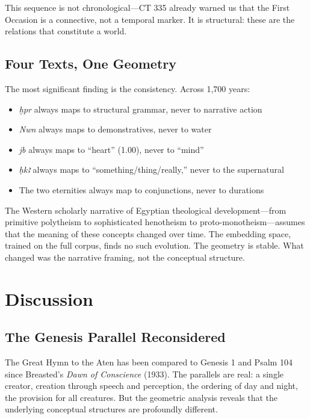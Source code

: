 \documentclass[11pt, a4paper]{article}
\begin{document}
This sequence is not chronological---CT 335 already warned us that the First Occasion is a connective, not a temporal marker. It is structural: these are the relations that constitute a world.

\subsection{Four Texts, One Geometry}

The most significant finding is the consistency. Across 1,700 years:

\begin{itemize}[nosep]
    \item \textit{ḫpr} always maps to structural grammar, never to narrative action
    \item \textit{Nwn} always maps to demonstratives, never to water
    \item \textit{jb} always maps to ``heart'' (1.00), never to ``mind''
    \item \textit{ḥkꜣ} always maps to ``something/thing/really,'' never to the supernatural
    \item The two eternities always map to conjunctions, never to durations
\end{itemize}

The Western scholarly narrative of Egyptian theological development---from primitive polytheism to sophisticated henotheism to proto-monotheism---assumes that the meaning of these concepts changed over time. The embedding space, trained on the full corpus, finds no such evolution. The geometry is stable. What changed was the narrative framing, not the conceptual structure.

\section{Discussion}
\label{sec:discussion}

\subsection{The Genesis Parallel Reconsidered}

The Great Hymn to the Aten has been compared to Genesis 1 and Psalm 104 since Breasted's \textit{Dawn of Conscience} (1933). The parallels are real: a single creator, creation through speech and perception, the ordering of day and night, the provision for all creatures. But the geometric analysis reveals that the underlying conceptual structures are profoundly different.
\end{document}
